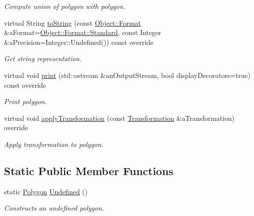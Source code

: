 \begin{DoxyCompactItemize}
\begin{DoxyCompactList}\small\item\em Compute union of polygon with polygon. \end{DoxyCompactList}\item 
virtual String \hyperlink{classostk_1_1math_1_1geom_1_1d2_1_1objects_1_1_polygon_a6e672ccf5f1101de80e636f097f0a0f7}{to\+String} (const \hyperlink{classostk_1_1math_1_1geom_1_1d2_1_1_object_aa76f9e30caebf4005bafbdff447f66cf}{Object\+::\+Format} \&a\+Format=\hyperlink{classostk_1_1math_1_1geom_1_1d2_1_1_object_aa76f9e30caebf4005bafbdff447f66cfaeb6d8ae6f20283755b339c0dc273988b}{Object\+::\+Format\+::\+Standard}, const Integer \&a\+Precision=Integer\+::\+Undefined()) const override
\begin{DoxyCompactList}\small\item\em Get string representation. \end{DoxyCompactList}\item 
virtual void \hyperlink{classostk_1_1math_1_1geom_1_1d2_1_1objects_1_1_polygon_adbf6ed9930a6dd2f3eab1c5c1b256ded}{print} (std\+::ostream \&an\+Output\+Stream, bool display\+Decorators=true) const override
\begin{DoxyCompactList}\small\item\em Print polygon. \end{DoxyCompactList}\item 
virtual void \hyperlink{classostk_1_1math_1_1geom_1_1d2_1_1objects_1_1_polygon_a00d04368f01daa0b234b403321453bbf}{apply\+Transformation} (const \hyperlink{classostk_1_1math_1_1geom_1_1d2_1_1_transformation}{Transformation} \&a\+Transformation) override
\begin{DoxyCompactList}\small\item\em Apply transformation to polygon. \end{DoxyCompactList}\end{DoxyCompactItemize}
\subsection*{Static Public Member Functions}
\begin{DoxyCompactItemize}
\item 
static \hyperlink{classostk_1_1math_1_1geom_1_1d2_1_1objects_1_1_polygon}{Polygon} \hyperlink{classostk_1_1math_1_1geom_1_1d2_1_1objects_1_1_polygon_af260e109c9315fd31f7f24f3154dcbf2}{Undefined} ()
\begin{DoxyCompactList}\small\item\em Constructs an undefined polygon. \end{DoxyCompactList}\end{DoxyCompactItemize}


